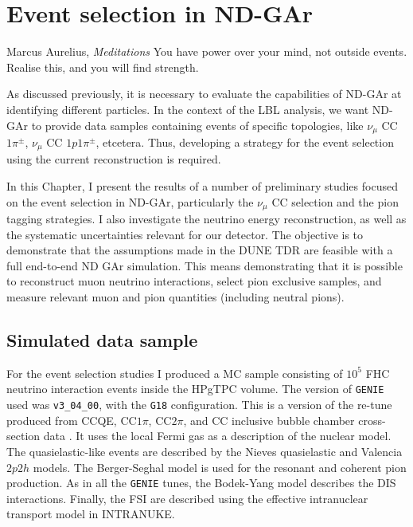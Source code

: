 \chapter{Event selection in ND-GAr}
\label{chapter:gar_selection}

\begin{chapquote}{Marcus Aurelius, \textit{Meditations}}
	You have power over your mind, not outside events. Realise this, and you will find strength.
\end{chapquote}

As discussed previously, it is necessary to evaluate the capabilities of ND-GAr at identifying different particles. In the context of the LBL analysis, we want ND-GAr to provide data samples containing events of specific topologies, like $\nu_{\mu}$ CC $1\pi^{\pm}$, $\nu_{\mu}$ CC $1p1\pi^{\pm}$, etcetera. Thus, developing a strategy for the event selection using the current reconstruction is required.

In this Chapter, I present the results of a number of preliminary studies focused on the event selection in ND-GAr, particularly the $\nu_{\mu}$ CC selection and the pion tagging strategies. I also investigate the neutrino energy reconstruction, as well as the systematic uncertainties relevant for our detector. The objective is to demonstrate that the assumptions made in the DUNE TDR are feasible with a full end-to-end ND GAr simulation. This means demonstrating that it is possible to reconstruct muon neutrino interactions, select pion exclusive samples, and measure relevant muon and pion quantities (including neutral pions).

\section{Simulated data sample}
\label{sec:gar_data}

For the event selection studies I produced a MC sample consisting of $10^{5}$ FHC neutrino interaction events inside the HPgTPC volume. The version of \texttt{GENIE} used was \texttt{v3_04_00}, with the \texttt{G18} configuration. This is a version of the re-tune produced from CCQE, CC$1\pi$, CC$2\pi$, and CC inclusive bubble chamber cross-section data \cite{GENIE2021}. It uses the local Fermi gas \cite{Chiang1989} as a description of the nuclear model. The quasielastic-like events are described by the Nieves quasielastic \cite{Nieves2004} and Valencia $2p2h$ \cite{Nieves2011} models. The Berger-Seghal model \cite{Berger2007,Berger2008} is used for the resonant and coherent pion production. As in all the \texttt{GENIE} tunes, the Bodek-Yang model \cite{Bodek2002} describes the DIS interactions. Finally, the FSI are described using the effective intranuclear transport model in INTRANUKE.

